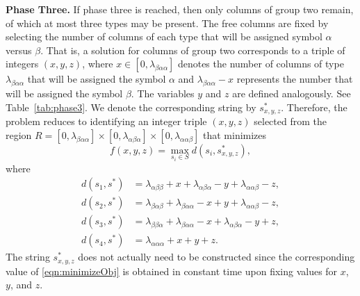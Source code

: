 {\bf Phase Three.}
If phase three is reached, then only columns of group two remain,
of which at most three types may be present.
The free columns are fixed by selecting the number of columns
of each type that will be assigned symbol $\alpha$ versus $\beta$.
That is, a solution for columns of group two corresponds to a triple of integers
$(x,y,z)$,
where $x \in [0,\lambda_{\beta\alpha\alpha}]$
denotes the number of columns of type $\lambda_{\beta\alpha\alpha}$
that will be assigned the symbol $\alpha$ 
and $\lambda_{\beta\alpha\alpha}-x$ represents the number that will 
be assigned the symbol $\beta$.
The variables $y$ and $z$ are defined analogously.
See Table~\ref{tab:phase3}.
We denote the corresponding string by $s^*_{x,y,z}$.
Therefore, the problem reduces to identifying an integer triple $(x,y,z)$
selected from the region $R = [0, \lambda_{\beta\alpha\alpha}]
\times [0, \lambda_{\alpha\beta\alpha}] 
\times [0, \lambda_{\alpha\alpha\beta}]$
that minimizes
\begin{equation}
\label{eqn:minimizeObj}
f(x,y,z) = \max_{s_i \in S} d(s_i, s^*_{x,y,z}) ,
\end{equation}
where
\begin{subequations}
\begin{align}
d(s_1, s^*) & = \lambda_{\alpha\beta\beta} + x + \lambda_{\alpha\beta\alpha} - y
+ \lambda_{\alpha\alpha\beta} - z , 
\label{eqn:phase3Constraint1}
\\
d(s_2, s^*) & = \lambda_{\beta\alpha\beta} + \lambda_{\beta\alpha\alpha} - x 
+ y + \lambda_{\alpha\alpha\beta} - z , 
\label{eqn:phase3Constraint2}
\\
d(s_3, s^*) & = \lambda_{\beta\beta\alpha} + \lambda_{\beta\alpha\alpha} - x 
+ \lambda_{\alpha\beta\alpha} - y + z , 
\label{eqn:phase3Constraint3}
\\
d(s_4, s^*) & = \lambda_{\alpha\alpha\alpha} + x + y + z .
\label{eqn:phase3Constraint4}
\end{align}
\end{subequations}
The string $s^*_{x,y,z}$ does not actually need to be constructed since
the corresponding value of \eqref{eqn:minimizeObj} is obtained in constant time
upon fixing values for $x$, $y$, and $z$.

